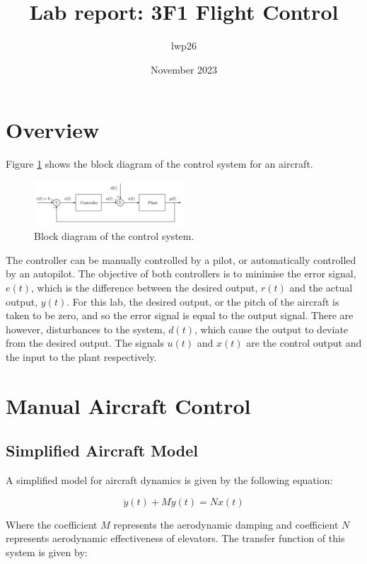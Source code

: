 \documentclass[8pt]{article}
\begin{document}

\title{Lab report: 3F1 Flight Control}
\author{lwp26}
\date{November 2023}
\maketitle

\section{Overview}

Figure \ref{fig:figure0} shows the block diagram of the control system for an aircraft.

\begin{figure}[H]
    \centering
    \includegraphics[width=0.5\textwidth]{images/block_diagram.png}
    \caption{Block diagram of the control system.}
    \label{fig:figure0}
\end{figure}

The controller can be manually controlled by a pilot, or automatically controlled by an autopilot.
The objective of both controllers is to minimise the error signal, $e(t)$, which is the difference between the desired output, $r(t)$ and the actual output, $y(t)$.
For this lab, the desired output, or the pitch of the aircraft is taken to be zero, and so the error signal is equal to the output signal.
There are however, disturbances to the system, $d(t)$, which cause the output to deviate from the desired output.
The signals $u(t)$ and $x(t)$ are the control output and the input to the plant respectively.

\section{Manual Aircraft Control}

\subsection{Simplified Aircraft Model}

A simplified model for aircraft dynamics is given by the following equation:

\[
 \ddot{y}(t) + M\dot{y}(t) = Nx(t)
\]

Where the coefficient $M$ represents the aerodynamic damping and coefficient $N$ represents aerodynamic effectiveness of elevators.
The transfer function of this system is given by:
\end{document}
